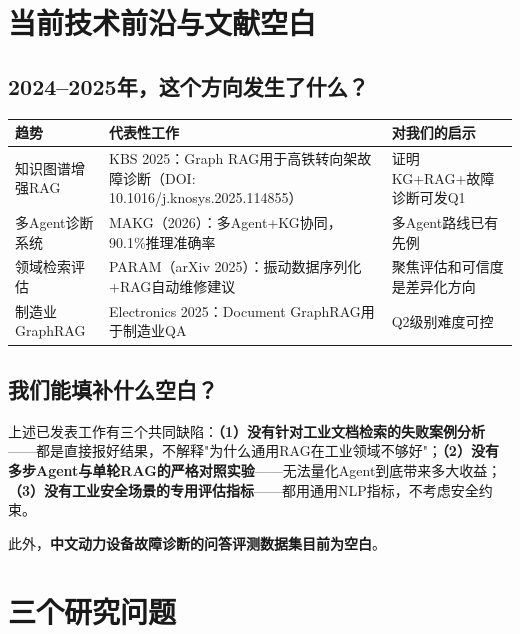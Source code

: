 \documentclass[a4paper, 11pt]{ctexart}
\begin{document}
\section{当前技术前沿与文献空白}

\subsection{2024--2025年，这个方向发生了什么？}

\begin{table}[H]
\centering
\renewcommand{\arraystretch}{1.2}
\small
\begin{tabular}{p{3.5cm} p{5cm} p{4.5cm}}
    \toprule
    \textbf{趋势} & \textbf{代表性工作} & \textbf{对我们的启示} \\
    \midrule
    知识图谱增强RAG & KBS 2025：Graph RAG用于高铁转向架故障诊断（DOI: 10.1016/j.knosys.2025.114855） & 证明KG+RAG+故障诊断可发Q1 \\
    多Agent诊断系统 & MAKG（2026）：多Agent+KG协同，90.1\%推理准确率 & 多Agent路线已有先例 \\
    领域检索评估 & PARAM（arXiv 2025）：振动数据序列化+RAG自动维修建议 & 聚焦评估和可信度是差异化方向 \\
    制造业GraphRAG & Electronics 2025：Document GraphRAG用于制造业QA & Q2级别难度可控 \\
    \bottomrule
\end{tabular}
\end{table}

\subsection{我们能填补什么空白？}

\begin{tcolorbox}[colback=bglight, colframe=tsinghua!30, arc=2mm]
上述已发表工作有三个共同缺陷：\textbf{（1）没有针对工业文档检索的失败案例分析}——都是直接报好结果，不解释"为什么通用RAG在工业领域不够好"；\textbf{（2）没有多步Agent与单轮RAG的严格对照实验}——无法量化Agent到底带来多大收益；\textbf{（3）没有工业安全场景的专用评估指标}——都用通用NLP指标，不考虑安全约束。

此外，\textbf{中文动力设备故障诊断的问答评测数据集目前为空白}。
\end{tcolorbox}


\section{三个研究问题}
\end{document}

